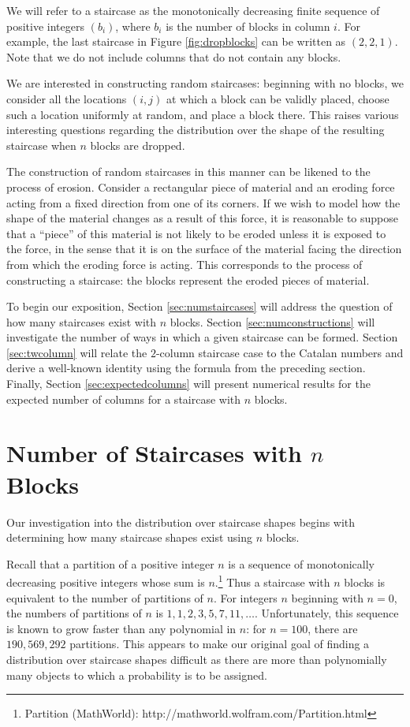 \documentclass[12pt]{amsart}
\newcommand{\newsection}[2]{
\section{#1 \label{#2}}
}
\begin{document}
We will refer to a staircase as the monotonically decreasing finite sequence of positive integers $(b_i)$, where $b_i$ is the number of blocks in column $i$. For example, the last staircase in Figure \ref{fig:dropblocks} can be written as $(2,2,1)$. Note that we do not include columns that do not contain any blocks.

We are interested in constructing random staircases: beginning with no blocks, we consider all the locations $(i, j)$ at which a block can be validly placed, choose such a location uniformly at random, and place a block there. This raises various interesting questions regarding the distribution over the shape of the resulting staircase when $n$ blocks are dropped.

The construction of random staircases in this manner can be likened to the process of erosion. Consider a rectangular piece of material and an eroding force acting from a fixed direction from one of its corners. If we wish to model how the shape of the material changes as a result of this force, it is reasonable to suppose that a ``piece'' of this material is not likely to be eroded unless it is exposed to the force, in the sense that it is on the surface of the material facing the direction from which the eroding force is acting. This corresponds to the process of constructing a staircase: the blocks represent the eroded pieces of material.

To begin our exposition, Section \ref{sec:numstaircases} will address the question of how many staircases exist with $n$ blocks. Section \ref{sec:numconstructions} will investigate the number of ways in which a given staircase can be formed. Section \ref{sec:twcolumn} will relate the $2$-column staircase case to the Catalan numbers and derive a well-known identity using the formula from the preceding section. Finally, Section \ref{sec:expectedcolumns} will present numerical results for the expected number of columns for a staircase with $n$ blocks.

\newsection{Number of Staircases with $n$ Blocks}{sec:numstaircases}
Our investigation into the distribution over staircase shapes begins with determining how many staircase shapes exist using $n$ blocks.

Recall that a partition of a positive integer $n$ is a sequence of monotonically decreasing positive integers whose sum is $n$.\footnote{Partition (MathWorld): http://mathworld.wolfram.com/Partition.html} Thus a staircase with $n$ blocks is equivalent to the number of partitions of $n$. For integers $n$ beginning with $n = 0$, the numbers of partitions of $n$ is $1, 1, 2, 3, 5, 7, 11, \ldots$. Unfortunately, this sequence is known to grow faster than any polynomial in $n$: for $n = 100$, there are $190,569,292$ partitions. This appears to make our original goal of finding a distribution over staircase shapes difficult as there are more than polynomially many objects to which a probability is to be assigned.
\end{document}
